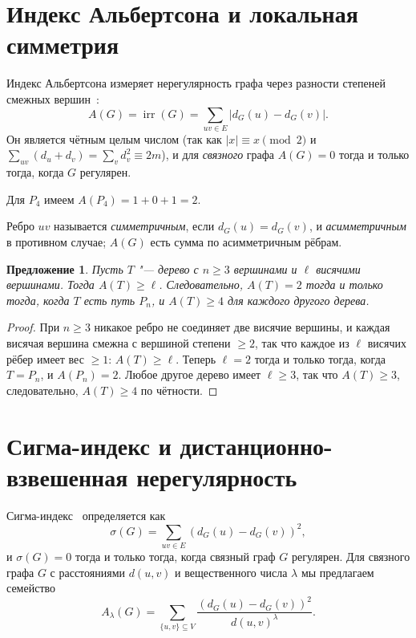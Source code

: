 \documentclass[a4paper,14pt]{extreport}
\theoremstyle{plain}
\newtheorem{proposition}[theorem]{Предложение}
\theoremstyle{definition}
\theoremstyle{remark}
\begin{document}
\section{Индекс Альбертсона и локальная симметрия}

Индекс Альбертсона измеряет нерегулярность графа через разности степеней смежных вершин~\cite{Albertson1997}:
\begin{equation}
	A(G)=\operatorname{irr}(G)=\sum_{uv\in E}|d_G(u)-d_G(v)| .
\end{equation}
Он является чётным целым числом (так как $|x|\equiv x\pmod2$ и $\sum_{uv}(d_u+d_v)=\sum_v d_v^2\equiv2m$), и для \emph{связного} графа $A(G)=0$ тогда и только тогда, когда $G$ регулярен.

Для $P_4$ имеем $A(P_4)=1+0+1=2$.

Ребро $uv$ называется \emph{симметричным}, если $d_G(u)=d_G(v)$, и \emph{асимметричным} в противном случае; $A(G)$ есть сумма по асимметричным рёбрам.

\begin{proposition}
	Пусть $T$ "--- дерево с $n\ge3$ вершинами и $\ell$ висячими вершинами. Тогда $A(T)\ge\ell$. Следовательно, $A(T)=2$ тогда и только тогда, когда $T$ есть путь $P_n$, и $A(T)\ge4$ для каждого другого дерева.
\end{proposition}
\begin{proof}
	При $n\ge3$ никакое ребро не соединяет две висячие вершины, и каждая висячая вершина смежна с вершиной степени $\ge2$, так что каждое из $\ell$ висячих рёбер имеет вес $\ge1$: $A(T)\ge\ell$. Теперь $\ell=2$ тогда и только тогда, когда $T=P_n$, и $A(P_n)=2$.
	Любое другое дерево имеет $\ell\ge3$, так что $A(T)\ge3$, следовательно, $A(T)\ge4$ по чётности.
\end{proof}
\section{Сигма-индекс и дистанционно-взвешенная нерегулярность}

Сигма-индекс~\cite{Gutman2018} определяется как
\begin{equation}
	\sigma(G)=\sum_{uv\in E}(d_G(u)-d_G(v))^2 ,
\end{equation}
и $\sigma(G)=0$ тогда и только тогда, когда связный граф $G$ регулярен. Для связного графа $G$ с расстояниями $d(u,v)$ и вещественного числа $\lambda$ мы предлагаем семейство
\begin{equation}
	A_\lambda(G)=\sum_{\{u,v\}\subseteq V}\frac{(d_G(u)-d_G(v))^2}{d(u,v)^{\lambda}} .
\end{equation}
\end{document}
